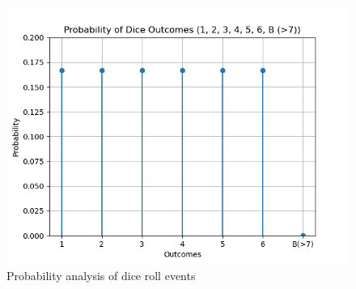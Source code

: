 \documentclass[journal]{IEEEtran}
\begin{document}
\begin{figure}[h!]
    \centering
    \includegraphics[width=\columnwidth]{figs/fig.png}
    \caption{Probability analysis of dice roll events}
    \label{fig:event_probs}
\end{figure}
\end{document}
